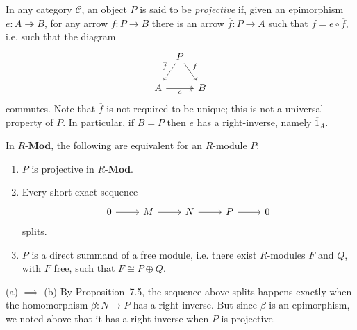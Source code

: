 \documentclass[article, a4paper, 11pt, oneside]{memoir}
\numberwithin{equation}{chapter}
\newcommand{\cat}[1]{\mathcal{#1}}
\newcommand{\scat}[1]{\mathbf{#1}} %
\newcommand{\catMod}[1]{{#1\text{-}\scat{Mod}}}
\newcommand{\catRMod}{\catMod{R}}
\theoremstyle{nonumberplain}
\begin{document}
\newcommand{\catC}{\cat{C}}

\begin{remarkbreak}
    \label{rem:projective-modules}
    In any category $\catC$, an object $P$ is said to be \emph{projective} if, given an epimorphism $e \colon A \twoheadrightarrow B$, for any arrow $f \colon P \to B$ there is an arrow $\overline{f} \colon P \to A$ such that $f = e \circ \overline{f}$, i.e. such that the diagram
    \begin{equation*}
        \begin{tikzcd}[column sep=tiny]
            & P
                \ar[dl, "\overline{f}", swap, dashed]
                \ar[dr, "f"]
            \\
            A
                \ar[rr, "e", swap, two heads]
            && B
        \end{tikzcd}
    \end{equation*}
    commutes. Note that $\overline{f}$ is not required to be unique; this is not a universal property of $P$. In particular, if $B = P$ then $e$ has a right-inverse, namely $\overline{1}_A$.

    In $\catRMod$, the following are equivalent for an $R$-module $P$:
    \begin{enumerate}
        \item $P$ is projective in $\catRMod$.
        
        \item Every short exact sequence
        \begin{equation*}
            \begin{tikzcd}
                0 \ar[r]
                & M \ar[r]
                & N \ar[r]
                & P \ar[r]
                & 0
            \end{tikzcd}
        \end{equation*}
        splits.
        
        \item $P$ is a direct summand of a free module, i.e. there exist $R$-modules $F$ and $Q$, with $F$ free, such that $F \cong P \oplus Q$.
    \end{enumerate}
    
    \begin{proofsec}
        \item[(a) $\implies$ (b)]
        By Proposition~7.5, the sequence above splits happens exactly when the homomorphism $\beta \colon N \to P$ has a right-inverse. But since $\beta$ is an epimorphism, we noted above that it has a right-inverse when $P$ is projective.


\end{proofsec}
\end{remarkbreak}
\end{document}
